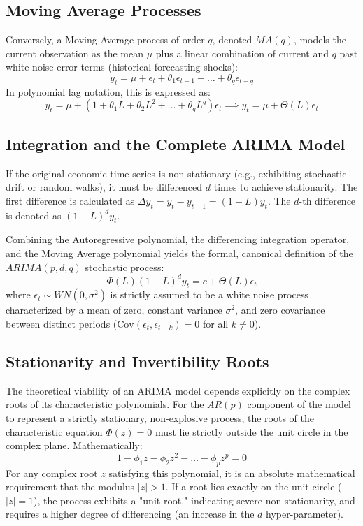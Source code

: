 \documentclass[11pt, a4paper]{report}
\begin{document}
\subsection{Moving Average Processes}
Conversely, a Moving Average process of order $q$, denoted $MA(q)$, models the current observation as the mean $\mu$ plus a linear combination of current and $q$ past white noise error terms (historical forecasting shocks):
\begin{equation}
    y_t = \mu + \epsilon_t + \theta_1 \epsilon_{t-1} + \dots + \theta_q \epsilon_{t-q}
\end{equation}
In polynomial lag notation, this is expressed as:
\begin{equation}
    y_t = \mu + \left(1 + \theta_1 L + \theta_2 L^2 + \dots + \theta_q L^q\right) \epsilon_t \implies y_t = \mu + \Theta(L) \epsilon_t
\end{equation}

\subsection{Integration and the Complete ARIMA Model}
If the original economic time series is non-stationary (e.g., exhibiting stochastic drift or random walks), it must be differenced $d$ times to achieve stationarity. The first difference is calculated as $\Delta y_t = y_t - y_{t-1} = (1-L)y_t$. The $d$-th difference is denoted as $(1-L)^d y_t$. 

Combining the Autoregressive polynomial, the differencing integration operator, and the Moving Average polynomial yields the formal, canonical definition of the $ARIMA(p, d, q)$ stochastic process:
\begin{equation}
    \Phi(L) (1-L)^d y_t = c + \Theta(L) \epsilon_t
\end{equation}
where $\epsilon_t \sim WN(0, \sigma^2)$ is strictly assumed to be a white noise process characterized by a mean of zero, constant variance $\sigma^2$, and zero covariance between distinct periods ($\text{Cov}(\epsilon_t, \epsilon_{t-k}) = 0$ for all $k \neq 0$).

\subsection{Stationarity and Invertibility Roots}
The theoretical viability of an ARIMA model depends explicitly on the complex roots of its characteristic polynomials. For the $AR(p)$ component of the model to represent a strictly stationary, non-explosive process, the roots of the characteristic equation $\Phi(z) = 0$ must lie strictly outside the unit circle in the complex plane. Mathematically:
\begin{equation}
    1 - \phi_1 z - \phi_2 z^2 - \dots - \phi_p z^p = 0
\end{equation}
For any complex root $z$ satisfying this polynomial, it is an absolute mathematical requirement that the modulus $|z| > 1$. If a root lies exactly on the unit circle ($|z| = 1$), the process exhibits a "unit root," indicating severe non-stationarity, and requires a higher degree of differencing (an increase in the $d$ hyper-parameter).
\end{document}

